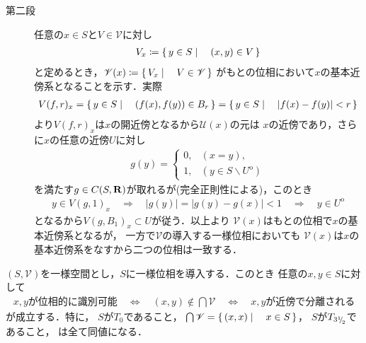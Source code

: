\begin{prf}
\begin{description}
			\item[第二段]
				任意の$x \in S$と$V \in \mathscr{V}$に対し
				\begin{align}
					V_x \coloneqq \left\{\, y \in S \mid \quad (x,y) \in V\, \right\}
				\end{align}
				と定めるとき，$\mathscr{V}(x) \coloneqq \left\{\, V_x \mid \quad V \in \mathscr{V}\, \right\}$
				がもとの位相において$x$の基本近傍系となることを示す．実際
				\begin{align}
					V(f,r)_x = \left\{\, y \in S \mid \quad (f(x),f(y)) \in B_r\, \right\}
					= \left\{\, y \in S \mid \quad |f(x)-f(y)|< r\, \right\}
				\end{align}
				より$V(f,r)_x$は$x$の開近傍となるから$\mathscr{U}(x)$の元は
				$x$の近傍であり，さらに$x$の任意の近傍$U$に対し
				\begin{align}
					g(y) = \begin{cases}
						0, & (x=y),\\
						1, & (y \in S \backslash U^{\mathrm{o}})
					\end{cases}
				\end{align}
				を満たす$g \in C(S,\mathbf{R})$が取れるが(完全正則性による)，このとき
				\begin{align}
					y \in V(g,1)_x \quad \Longrightarrow \quad
					|g(y)| = |g(y) - g(x)| < 1 \quad \Longrightarrow \quad
					y \in U^{\mathrm{o}}
				\end{align}
				となるから$V(g,B_1)_x \subset U$が従う．以上より
				$\mathscr{V}(x)$はもとの位相で$x$の基本近傍系となるが，
				一方で$\mathscr{V}$の導入する一様位相においても
				$\mathscr{V}(x)$は$x$の基本近傍系をなすから二つの位相は一致する．
				\QED
		\end{description}
	\end{prf}
	
	\begin{screen}
		\begin{thm}
		\label{thm:T_0_iff_T_2_on_uniform_topological_space}
			$(S,\mathscr{V})$を一様空間とし，$S$に一様位相を導入する．このとき
			任意の$x,y \in S$に対して
			\begin{align}
				\mbox{$x,y$が位相的に識別可能}
				\quad \Longleftrightarrow \quad
				(x,y) \notin \bigcap \mathscr{V}
				\quad \Longleftrightarrow \quad
				\mbox{$x,y$が近傍で分離される}
				\label{eq:thm_T_0_iff_T_2_on_uniform_topological_space_0}
			\end{align}
			が成立する．特に，
			$S$が$T_0$であること，
			$\bigcap \mathscr{V} = \left\{\, (x,x) \mid \quad x \in S\, \right\}$，
			$S$が$T_{3{}^1{\mskip -5mu/\mskip -3mu}_2}$であること，
			は全て同値になる．
		\end{thm}
	\end{screen}
	
